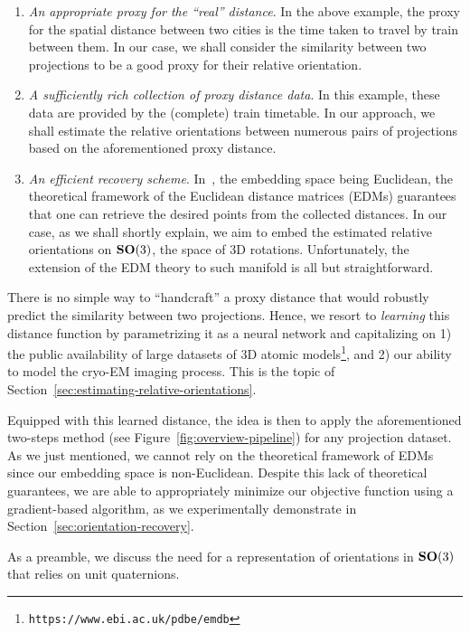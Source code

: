 \begin{enumerate}
    \item \textit{An appropriate proxy for the ``real'' distance}. In the above example, the proxy for the spatial distance between two cities is the time taken to travel by train between them. In our case, we shall consider the similarity between two projections to be a good proxy for their relative orientation.
    \item \textit{A sufficiently rich collection of proxy distance data}. In this example, these data are provided by the (complete) train timetable. In our approach, we shall estimate the relative orientations between numerous pairs of projections based on the aforementioned proxy distance.
    \item \textit{An efficient recovery scheme}. In~\cite{dokmanic2015euclidean}, the embedding space being Euclidean, the theoretical framework of the Euclidean distance matrices (EDMs) guarantees that one can retrieve the desired points from the collected distances. In our case, as we shall shortly explain, we aim to embed the estimated relative orientations on $\mathrm{\mathbf{SO}}(3)$, the space of 3D rotations. Unfortunately, the extension of the EDM theory to such manifold is all but straightforward.
\end{enumerate}

There is no simple way to ``handcraft'' a proxy distance that would robustly predict the similarity between two projections. Hence, we resort to \textit{learning} this distance function by parametrizing it as a neural network and capitalizing on 1) the public availability of large datasets of 3D atomic models\footnote{\texttt{https://www.ebi.ac.uk/pdbe/emdb}}, and 2) our ability to model the cryo-EM imaging process. This is the topic of Section~\ref{sec:estimating-relative-orientations}.

Equipped with this learned distance, the idea is then to apply the aforementioned two-steps method (see Figure~\ref{fig:overview-pipeline}) for any projection dataset. As we just mentioned, we cannot rely on the theoretical framework of EDMs since our embedding space is non-Euclidean. Despite this lack of theoretical guarantees, we are able to appropriately minimize our objective function using a gradient-based algorithm, as we experimentally demonstrate in Section~\ref{sec:orientation-recovery}.

As a preamble, we discuss the need for a representation of orientations in $\mathrm{\mathbf{SO}}(3)$ that relies on unit quaternions.

